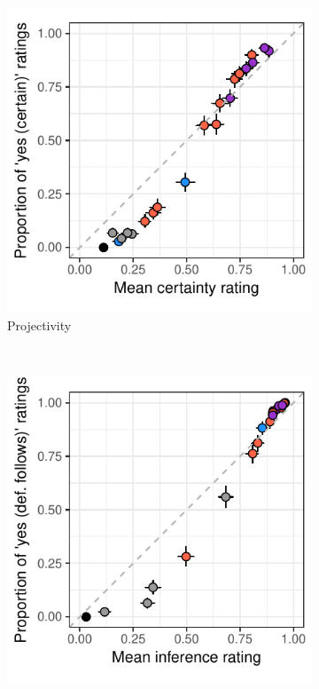 \documentclass[11pt,fleqn]{article}
\newcommand{\6}{\mbox{$[\hspace*{-.6mm}[$}}
\newcommand{\9}{\mbox{$]\hspace*{-.6mm}]$}}
\begin{document}
{\begin{figure}[h!]
\begin{subfigure}{.33\textwidth}
\centering
\includegraphics[width=.25\paperwidth]{../../results/compare-binary-nonbinary/graphs/projectivity}
\caption{Projectivity}
\end{subfigure}~\quad    
\begin{subfigure}{.33\textwidth}
\centering
\includegraphics[width=.25\paperwidth]{../../results/compare-binary-nonbinary/graphs/entailment-inference}

\end{subfigure}
\end{figure}}
\end{document}
